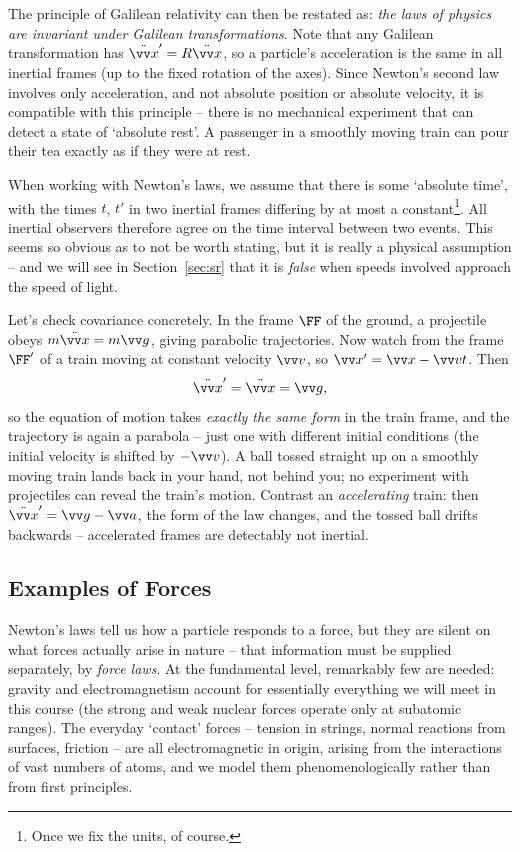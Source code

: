 The principle of Galilean relativity can then be restated as: \emph{the laws of physics are invariant under Galilean transformations}. Note that any Galilean transformation has $\ddot{\vv x}' = R\ddot{\vv x}$, so a particle's acceleration is the same in all inertial frames (up to the fixed rotation of the axes). Since Newton's second law involves only acceleration, and not absolute position or absolute velocity, it is compatible with this principle -- there is no mechanical experiment that can detect a state of `absolute rest'. A passenger in a smoothly moving train can pour their tea exactly as if they were at rest.

When working with Newton's laws, we assume that there is some `absolute time', with the times $t$, $t'$ in two inertial frames differing by at most a constant\footnote{Once we fix the units, of course.}. All inertial observers therefore agree on the time interval between two events. This seems so obvious as to not be worth stating, but it is really a physical assumption -- and we will see in Section~\ref{sec:sr} that it is \emph{false} when speeds involved approach the speed of light.

\begin{example}
	Let's check covariance concretely. In the frame $\FF$ of the ground, a projectile obeys $m\ddot{\vv x} = m \vv g$, giving parabolic trajectories. Now watch from the frame $\FF'$ of a train moving at constant velocity $\vv v$, so $\vv x' = \vv x - \vv v t$. Then
	$$
	\ddot{\vv x}' = \ddot{\vv x} = \vv g,
	$$
	so the equation of motion takes \emph{exactly the same form} in the train frame, and the trajectory is again a parabola -- just one with different initial conditions (the initial velocity is shifted by $-\vv v$). A ball tossed straight up on a smoothly moving train lands back in your hand, not behind you; no experiment with projectiles can reveal the train's motion. Contrast an \emph{accelerating} train: then $\ddot{\vv x}' = \vv g - \vv a$, the form of the law changes, and the tossed ball drifts backwards -- accelerated frames are detectably not inertial.
\end{example}

\subsection{Examples of Forces}

Newton's laws tell us how a particle responds to a force, but they are silent on what forces actually arise in nature -- that information must be supplied separately, by \emph{force laws}. At the fundamental level, remarkably few are needed: gravity and electromagnetism account for essentially everything we will meet in this course (the strong and weak nuclear forces operate only at subatomic ranges). The everyday `contact' forces -- tension in strings, normal reactions from surfaces, friction -- are all electromagnetic in origin, arising from the interactions of vast numbers of atoms, and we model them phenomenologically rather than from first principles.

